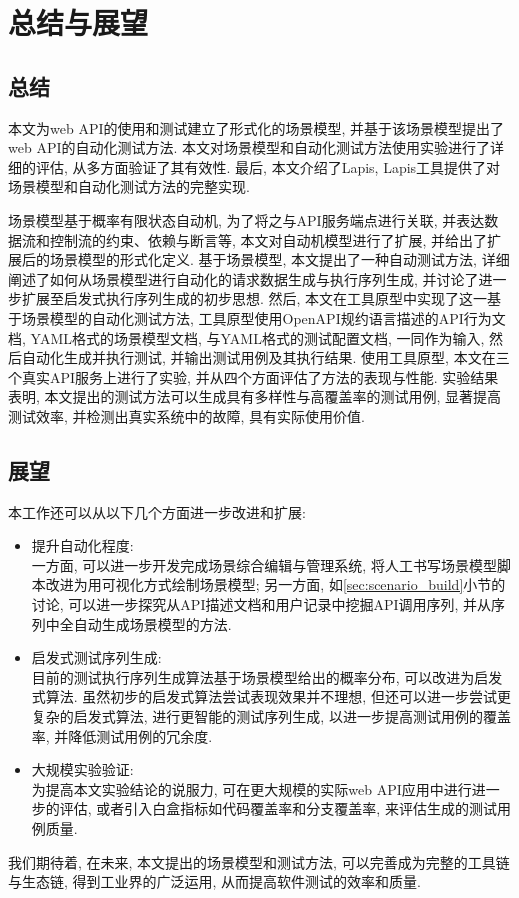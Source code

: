 \chapter{总结与展望}
    
    \section{总结}
        本文为web API的使用和测试建立了形式化的场景模型, 并基于该场景模型提出了web API的自动化测试方法. 本文对场景模型和自动化测试方法使用实验进行了详细的评估, 从多方面验证了其有效性. 最后, 本文介绍了Lapis, Lapis工具提供了对场景模型和自动化测试方法的完整实现.
        
        场景模型基于概率有限状态自动机, 为了将之与API服务端点进行关联, 并表达数据流和控制流的约束、依赖与断言等, 本文对自动机模型进行了扩展, 并给出了扩展后的场景模型的形式化定义. 基于场景模型, 本文提出了一种自动测试方法, 详细阐述了如何从场景模型进行自动化的请求数据生成与执行序列生成, 并讨论了进一步扩展至启发式执行序列生成的初步思想. 然后, 本文在工具原型中实现了这一基于场景模型的自动化测试方法, 工具原型使用OpenAPI规约语言描述的API行为文档, YAML格式的场景模型文档, 与YAML格式的测试配置文档, 一同作为输入, 然后自动化生成并执行测试, 并输出测试用例及其执行结果. 使用工具原型, 本文在三个真实API服务上进行了实验, 并从四个方面评估了方法的表现与性能. 实验结果表明, 本文提出的测试方法可以生成具有多样性与高覆盖率的测试用例, 显著提高测试效率, 并检测出真实系统中的故障, 具有实际使用价值.
    
    \section{展望}
    
        本工作还可以从以下几个方面进一步改进和扩展:
        \begin{itemize}
            \item 提升自动化程度:\\
            一方面, 可以进一步开发完成场景综合编辑与管理系统, 将人工书写场景模型脚本改进为用可视化方式绘制场景模型; 另一方面, 如\ref{sec:scenario_build}小节的讨论, 可以进一步探究从API描述文档和用户记录中挖掘API调用序列, 并从序列中全自动生成场景模型的方法.
            
            \item 启发式测试序列生成:\\
            目前的测试执行序列生成算法基于场景模型给出的概率分布, 可以改进为启发式算法. 虽然初步的启发式算法尝试表现效果并不理想, 但还可以进一步尝试更复杂的启发式算法, 进行更智能的测试序列生成, 以进一步提高测试用例的覆盖率, 并降低测试用例的冗余度.
            
            \item 大规模实验验证:\\
            为提高本文实验结论的说服力, 可在更大规模的实际web API应用中进行进一步的评估, 或者引入白盒指标如代码覆盖率和分支覆盖率, 来评估生成的测试用例质量.
        \end{itemize}
        
        我们期待着, 在未来, 本文提出的场景模型和测试方法, 可以完善成为完整的工具链与生态链, 得到工业界的广泛运用, 从而提高软件测试的效率和质量.
